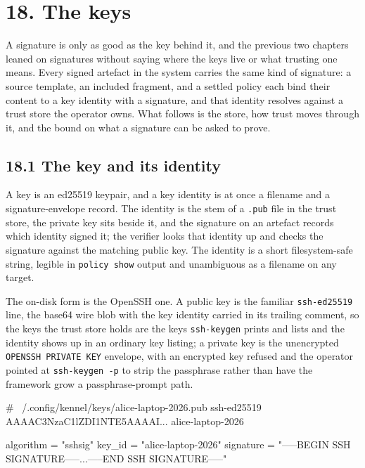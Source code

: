 \hypertarget{the-keys}{%
\chapter{18. The keys}\label{the-keys}}

A signature is only as good as the key behind it, and the previous two
chapters leaned on signatures without saying where the keys live or what
trusting one means. Every signed artefact in the system carries the same
kind of signature: a source template, an included fragment, and a
settled policy each bind their content to a key identity with a
signature, and that identity resolves against a trust store the operator
owns. What follows is the store, how trust moves through it, and the
bound on what a signature can be asked to prove.

\hypertarget{the-key-and-its-identity}{%
\section{18.1 The key and its identity}\label{the-key-and-its-identity}}

A key is an ed25519 keypair, and a key identity is at once a filename
and a signature-envelope record. The identity is the stem of a
\texttt{.pub} file in the trust store, the private key sits beside it,
and the signature on an artefact records which identity signed it; the
verifier looks that identity up and checks the signature against the
matching public key. The identity is a short filesystem-safe string,
legible in \texttt{policy\ show} output and unambiguous as a filename on
any target.

The on-disk form is the OpenSSH one. A public key is the familiar
\texttt{ssh-ed25519} line, the base64 wire blob with the key identity
carried in its trailing comment, so the keys the trust store holds are
the keys \texttt{ssh-keygen} prints and lists and the identity shows up
in an ordinary key listing; a private key is the unencrypted
\texttt{OPENSSH\ PRIVATE\ KEY} envelope, with an encrypted key refused
and the operator pointed at \texttt{ssh-keygen\ -p} to strip the
passphrase rather than have the framework grow a passphrase-prompt path.

\begin{kennelcode}
# ~/.config/kennel/keys/alice-laptop-2026.pub
ssh-ed25519 AAAAC3NzaC1lZDI1NTE5AAAAI... alice-laptop-2026
\end{kennelcode}

\begin{kennelcode}
[signature]
algorithm = "sshsig"
key_id = "alice-laptop-2026"
signature = "-----BEGIN SSH SIGNATURE-----\n...\n-----END SSH SIGNATURE-----\n"
\end{kennelcode}

